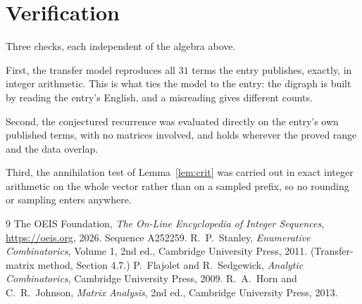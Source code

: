 \documentclass[11pt,a4paper]{article}
\theoremstyle{plain}
\theoremstyle{definition}
\begin{document}
\section{Verification}

Three checks, each independent of the algebra above.

First, the transfer model reproduces all $31$ terms the entry publishes, exactly, in
integer arithmetic. This is what ties the model to the entry: the digraph is built by reading
the entry's English, and a misreading gives different counts.

Second, the conjectured recurrence was evaluated directly on the entry's own published terms,
with no matrices involved, and holds wherever the proved range and the data overlap.

Third, the annihilation test of Lemma~\ref{lem:crit} was carried out in exact integer
arithmetic on the whole vector rather than on a sampled prefix, so no rounding or sampling
enters anywhere.

\begin{thebibliography}{9}
 The OEIS Foundation, \emph{The On-Line Encyclopedia of Integer
Sequences}, \url{https://oeis.org}, 2026. Sequence A252259.
 R.~P.~Stanley, \emph{Enumerative Combinatorics}, Volume 1, 2nd ed.,
Cambridge University Press, 2011. (Transfer-matrix method, Section 4.7.)
 P.~Flajolet and R.~Sedgewick, \emph{Analytic Combinatorics}, Cambridge
University Press, 2009.
 R.~A.~Horn and C.~R.~Johnson, \emph{Matrix Analysis}, 2nd ed., Cambridge
University Press, 2013.
\end{thebibliography}
\end{document}
